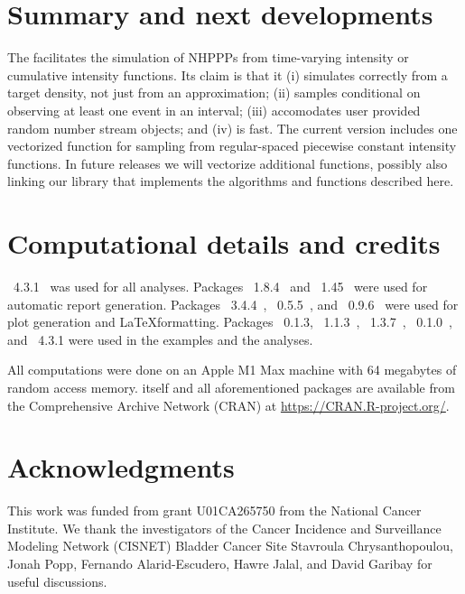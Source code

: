 \documentclass[article]{jss}\usepackage[]{graphicx}\usepackage[]{xcolor}
\begin{document}

\section{Summary and next developments} \label{sec:summary}

The  facilitates the simulation of NHPPPs from time-varying intensity or cumulative intensity functions. Its claim is that it (i) simulates correctly from a target density, not just from an approximation; (ii) samples conditional on observing at least one event in an interval; (iii) accomodates user provided random number stream objects; and (iv) is fast. The current version includes one vectorized function for sampling from regular-spaced piecewise constant intensity functions. In future releases we will vectorize additional functions, possibly also linking our  library that implements the algorithms and functions described here.



\section*{Computational details and credits}

~4.3.1~\citep{R-program}
was used for all analyses.
Packages
~{1.8.4}~\citep{xtable-package} and
~{1.45}~\citep{knitr-package}
were used for automatic report generation. Packages
~{3.4.4}~\citep{ggplot2-package},
~{0.5.5}~\citep{ggridges-package}, and
~{0.9.6}~\citep{latex2exp-package}
were used for plot generation and \LaTeX formatting.
Packages
~{0.1.3}, %
~{1.1.3}~\citep{bench-package},
~{1.3.7}~\citep{rstream-package},
~{0.1.0}~\citep{otinference-package}, and
~{4.3.1}
were used in the examples and the analyses.

All computations were done on an Apple M1 Max machine with 64 megabytes of random access memory.
%
 itself
and all aforementioned packages are available from the Comprehensive
 Archive Network (CRAN) at
\url{https://CRAN.R-project.org/}.


\section*{Acknowledgments}
This work was funded from grant U01CA265750 from the National Cancer Institute.
We thank the investigators of the Cancer Incidence and Surveillance Modeling Network (CISNET)
Bladder Cancer Site Stavroula Chrysanthopoulou, Jonah Popp, Fernando Alarid-Escudero,
Hawre Jalal, and David Garibay for useful discussions.
\end{document}
